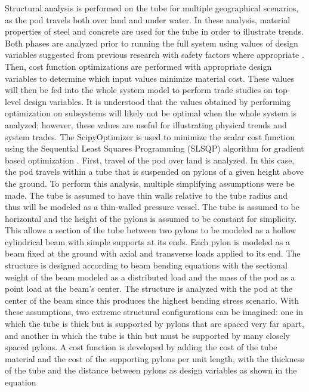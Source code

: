 Structural analysis is performed on the tube for multiple geographical scenarios,
as the pod travels both over land and under water.
In these analysis, material properties of steel and concrete are used for the
tube in order to illustrate trends.
Both phases are analyzed prior to running the full system using values of
design variables suggested from previous research with safety factors where
appropriate \cite{Chin}. Then, cost function optimizations are performed with
appropriate design variables to determine which input values minimize material cost.
These values will then be fed into the whole system model to perform trade
studies on top-level design variables. It is understood that the values
obtained by performing optimization on subsystems will likely not be optimal
when the whole system is analyzed; however, these values are useful for
illustrating physical trends and system trades. The ScipyOptimizer is used to
minimize the scalar cost function using the Sequential Least Squares Programming
(SLSQP) algorithm for gradient based optimization \cite{GrayBenchmarking2013,Scipy}.
First, travel of the pod over land is analyzed. In this case, the pod travels
within a tube that is suspended on pylons of a given height above the ground.
To perform this analysis, multiple simplifying assumptions were be made. The
tube is assumed to have thin walls relative to the tube radius and thus will be
modeled as a thin-walled pressure vessel. The tube is assumed to be horizontal
and the height of the pylons is assumed to be constant for simplicity. This allows a section
of the tube between two pylons to be modeled as a hollow cylindrical beam with
simple supports at its ends. Each pylon is modeled as a beam fixed at the
ground with axial and transverse loads applied to its end. The structure is
designed according to beam bending equations with the sectional weight of the
beam modeled as a distributed load and the mass of the pod as a point load at
the beam’s center. The structure is analyzed with the pod at the center of the
beam since this produces the highest bending stress scenario.  With these
assumptions, two extreme structural configurations can be imagined: one in
which the tube is thick but is supported by pylons that are spaced very far apart,
and another in which the tube is thin but must be supported by many closely spaced pylons.
A cost function is developed by adding the cost of the tube material and the
cost of the supporting pylons per unit length, with the thickness of the tube
and the distance between pylons as design variables as shown in the equation

